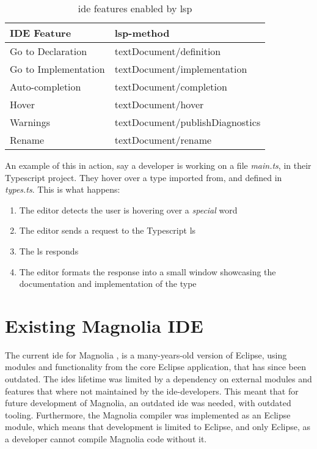 \begin{table}[]
  \centering
  \caption{\gls{ide} features enabled by \gls{lsp}}
  \label{tbl:ide}
  \begin{tabular}{|l|l|}
    \hline
    IDE Feature & \gls{lsp}-method \\ \hline
    Go to Declaration & textDocument/definition \\ \hline
    Go to Implementation & textDocument/implementation \\ \hline
    Auto-completion & textDocument/completion \\ \hline
    Hover & textDocument/hover \\ \hline
    Warnings & textDocument/publishDiagnostics \\ \hline
    Rename & textDocument/rename \\ \hline
  \end{tabular}
\end{table}

An example of this in action, say a developer is working on a file
\textit{main.ts}, in their Typescript project. They hover over a type imported
from, and defined in \textit{types.ts}. This is what happens:

\begin{enumerate}
  \item The editor detects the user is hovering over a \textit{special} word
  \item The editor sends a request to the Typescript \gls{ls}
  \item The \gls{ls} responds
  \item The editor formats the response into a small window showcasing the
    documentation and implementation of the type
\end{enumerate}


\section{Existing Magnolia IDE}

The current \gls{ide} for Magnolia \cite{baggeIde}, is a many-years-old version
of Eclipse, using modules and functionality from the core Eclipse application,
that has since been outdated. The \gls{ide}s lifetime was limited by a
dependency on external modules and features that where not maintained by the
\gls{ide}-developers. This meant that for future development of Magnolia, an
outdated \gls{ide} was needed, with outdated tooling. Furthermore, the Magnolia
compiler was implemented as an Eclipse module, which means that development is
limited to Eclipse, and only Eclipse, as a developer cannot compile Magnolia
code without it.


